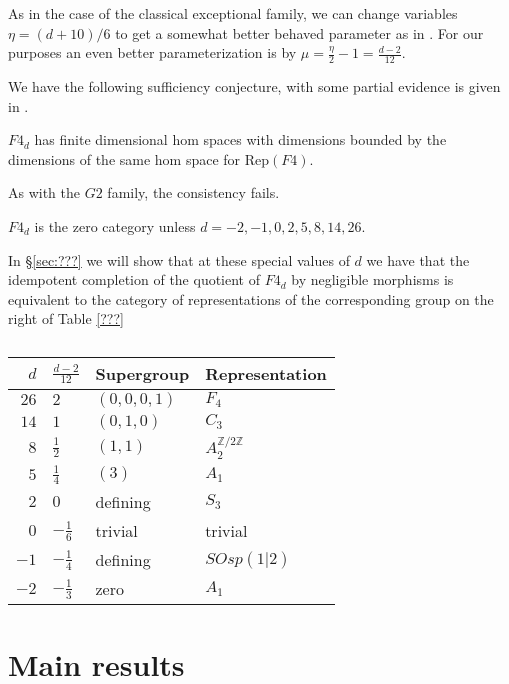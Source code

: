 \documentclass[12pt]{amsart}
\begin{document}
As in the case of the classical exceptional family, we can change variables $\eta = (d+10)/6$ to get a somewhat better behaved parameter as in \cite{???}.  For our purposes an even better parameterization is by $\mu = \frac{\eta}{2} - 1 = \frac{d-2}{12}$.

We have the following sufficiency conjecture, with some partial evidence is given in \cite{???}.

\begin{conjecture}
$F4_d$ has finite dimensional hom spaces with dimensions bounded by the dimensions of the same hom space for $\mathrm{Rep}(F4)$.
\end{conjecture}

As with the $G2$ family, the consistency fails.

\begin{theorem}
$F4_d$ is the zero category unless $d = -2, -1, 0, 2, 5, 8, 14, 26.$
\end{theorem}

In \S \ref{sec:???} we will show that at these special values of $d$ we have that the idempotent completion of the quotient of $F4_d$ by negligible morphisms is equivalent to the category of representations of the corresponding group on the right of Table \ref{???}

\begin{table}
  \begin{tabular}{rlll}
    \toprule
    $d$ & $\frac{d-2}{12}$ & Supergroup & Representation  \\ \midrule
    $26$ & $2$ & $(0,0,0,1)$ & $F_4$   \\
    $14$ & $1$ & $(0,1,0)$ & $C_3$   \\
    $8$ & $\frac{1}{2}$ & $(1,1)$ & $A_2^{\mathbb{Z}/2\mathbb{Z}}$   \\
    $5$ & $\frac{1}{4}$ & $(3)$ & $A_1$ \\
    $2$ & $0$ & defining & $S_3$ \\
    $0$ & $-\frac{1}{6}$ & trivial & trivial \\
    $-1$ & $-\frac{1}{4}$ & defining & $SOsp(1|2)$ \\ 
    $-2$ & $-\frac{1}{3}$ & zero & $A_1$ \\        
    \bottomrule
  \end{tabular}
  \caption{}
\end{table}



\section{Main results}
\end{document}
